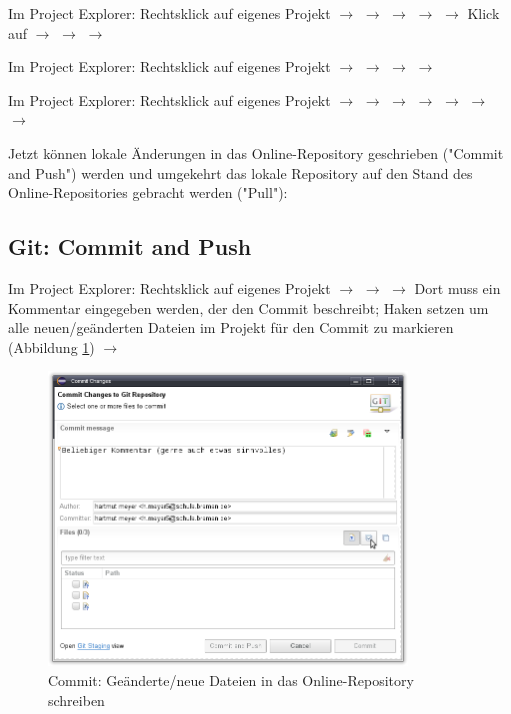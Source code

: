 \begin{compactenum}
\item Im Project Explorer: Rechtsklick auf eigenes Projekt $\rightarrow$
 $\rightarrow$  $\rightarrow$  $\rightarrow$  $\rightarrow$ Klick auf
 $\rightarrow$  $\rightarrow$
  $\rightarrow$ 

\item Im Project Explorer: Rechtsklick auf eigenes Projekt $\rightarrow$
 $\rightarrow$  $\rightarrow$  $\rightarrow$ 

\item Im Project Explorer: Rechtsklick auf eigenes Projekt $\rightarrow$
 $\rightarrow$  $\rightarrow$  $\rightarrow$  $\rightarrow$  $\rightarrow$  $\rightarrow$ 
\end{compactenum}

\clearpage


Jetzt können lokale Änderungen in das Online-Repository geschrieben ("Commit
and Push") werden und umgekehrt das lokale Repository auf den Stand des
Online-Repositories gebracht werden ("Pull"):

\subsection{Git: Commit and Push}

Im Project Explorer: Rechtsklick auf eigenes Projekt $\rightarrow$ 
$\rightarrow$  $\rightarrow$ Dort muss ein Kommentar
eingegeben werden, der den Commit beschreibt; Haken setzen um alle
neuen/geänderten Dateien im Projekt für den Commit zu markieren (Abbildung
\ref{fig:git-commit}) $\rightarrow$ 

\begin{figure}[h]
  \centering
   \includegraphics[width=0.85\textwidth]{./inf/SEKII/01_Vorbereitung/Git-Commit.png}
   \caption{Commit: Geänderte/neue Dateien in das Online-Repository schreiben}
   \label{fig:git-commit}
\end{figure}

